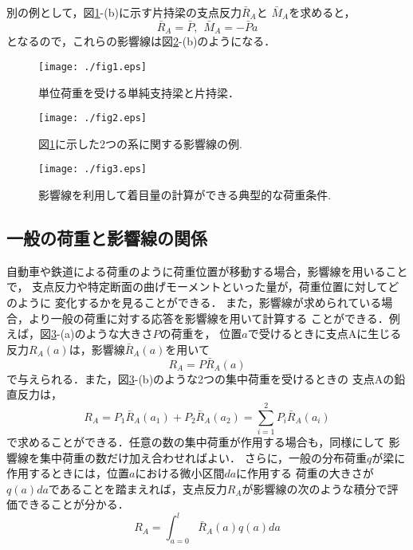 \documentclass[10pt,a4j]{jbook}
\begin{document}
別の例として，図\ref{fig:fig13_1}-(b)に示す片持梁の支点反力$\bar R_A$と
$\bar M_A$を求めると，
\begin{equation}
	\bar{R}_A=\bar{P}, \ \ 
	\bar{M}_A=-\bar{P} a
	\label{eqn:Mbar_2}
\end{equation}
となるので，これらの影響線は図\ref{fig:fig13_2}-(b)のようになる．
\begin{figure}[h]
	\begin{center}
	\texttt{[image: ./fig1.eps]} 
	\end{center}
	\caption{
		単位荷重を受ける単純支持梁と片持梁．
	} 
	\label{fig:fig13_1}
\end{figure}
\begin{figure}[h]
	\begin{center}
	\texttt{[image: ./fig2.eps]} 
	\end{center}
	\caption{
		図\ref{fig:fig13_1}に示した2つの系に関する影響線の例.
	} 
	\label{fig:fig13_2}
\end{figure}
\begin{figure}[h]
	\begin{center}
	\texttt{[image: ./fig3.eps]} 
	\end{center}
	\caption{
		影響線を利用して着目量の計算ができる典型的な荷重条件.
	} 
	\label{fig:fig13_3}
\end{figure}
\subsection{一般の荷重と影響線の関係}
自動車や鉄道による荷重のように荷重位置が移動する場合，影響線を用いることで，
支点反力や特定断面の曲げモーメントといった量が，荷重位置に対してどのように
変化するかを見ることができる．
また，影響線が求められている場合，より一般の荷重に対する応答を影響線を用いて計算する
ことができる．例えば，図\ref{fig:fig13_3}-(a)のような大きさ$P$の荷重を，
位置$a$で受けるときに支点Aに生じる反力$R_A(a)$は，影響線$\bar R_A(a)$を用いて
\begin{equation}
	R_A =  P\bar{R}_A(a) 
\end{equation}
で与えられる．また，図\ref{fig:fig13_3}-(b)のような2つの集中荷重を受けるときの
支点Aの鉛直反力は，
\begin{equation}
	R_A =  
	P_1 \bar{R}_A(a_1)
	+
	P_2 \bar{R}_A(a_2)
	=
	\sum_{i=1}^2
	P_i \bar{R}_A(a_i)
\end{equation}
で求めることができる．任意の数の集中荷重が作用する場合も，同様にして
影響線を集中荷重の数だけ加え合わせればよい．
さらに，一般の分布荷重$q$が梁に作用するときには，位置$a$における微小区間$da$に作用する
荷重の大きさが$q(a)da$であることを踏まえれば，支点反力$R_A$が影響線の次のような積分で評価できることが分かる．
\begin{equation}
	R_A=\int_{a=0}^l \bar{R}_A(a)q(a)da 
\end{equation}
\end{document}
